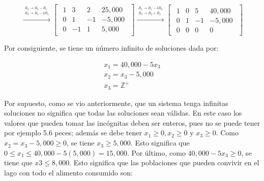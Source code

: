 \documentclass{article}
\begin{document}
\begin{equation*}
    \xrightarrow{\overset{\begin{aligned} R_2 \rightarrow R_2 - R_1 \\ R_3 \rightarrow R_3 - 2R_1\end{aligned}}{}} 
    \begin{bmatrix}
        \begin{array}{rrr|r}
            1& 3 & 2 & 25,000\\
            0 & 1 &-1 &-5,000 \\
            0 & -1 & 1 & 5,000
        \end{array}
    \end{bmatrix}
    \xrightarrow{\overset{\begin{aligned} R_1 \rightarrow R_1 - 3R_2 \\ R_3 \rightarrow R_3 + R_2\end{aligned}}{}} 
    \begin{bmatrix}
        \begin{array}{rrr|r}
            1 & 0 & 5 & 40,000\\
            0 & 1 & -1 & -5,000\\
            0 & 0 & 0 & 0
        \end{array}
    \end{bmatrix}
\end{equation*}

Por consiguiente, se tiene un número infinito de soluciones dada por: 

\begin{equation*}
    \begin{aligned}
        x_1 = 40,000 - 5x_3\\
        x_2 = x_3 - 5,000\\
        x_3 = \mathbb{Z}^+
    \end{aligned}
\end{equation*}

Por supuesto, como se vio anteriormente, que un sistema tenga infinitas soluciones no significa que todas las soluciones sean válidas. En este caso los valores que pueden tomar las incógnitas deben ser enteros, pues no se puede tener por ejemplo 5.6 peces; además se debe tener $x_1 \geq 0, x_2 \geq 0$ y $x_3 \geq 0$. Como $x_2 = x_3 - 5,000 \geq 0$, se tiene $x_3 \geq 5,000$. Esto significa que $0 \leq x_1 \leq 40,000 - 5(5,000)= 15,000$. Por último, como $40,000 - 5x_3 \geq 0$, se tiene que $x3 \leq 8,000$. Esto significa que las poblaciones que pueden convivir en el lago con todo el alimento consumido son: 
\end{document}
